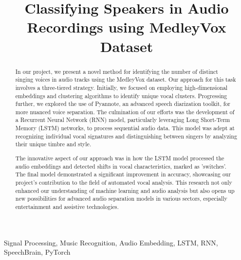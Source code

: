 \documentclass[conference]{IEEEtran}
\begin{document}
\title{Classifying Speakers in Audio Recordings using MedleyVox Dataset
}

\author{
\and
{}
}
\maketitle

\begin{abstract}
In our project, we present a novel method for identifying the number of distinct singing voices in audio tracks using the MedleyVox dataset. 
Our approach for this task involves a three-tiered strategy. Initially, we focused on employing high-dimensional embeddings and clustering algorithms to identify unique vocal clusters. Progressing further, we explored the use of Pyannote, an advanced speech diarization toolkit, for more nuanced voice separation. The culmination of our efforts was the development of a Recurrent Neural Network (RNN) model, particularly leveraging Long Short-Term Memory (LSTM) networks, to process sequential audio data. This model was adept at recognizing individual vocal signatures and distinguishing between singers by analyzing their unique timbre and style.

The innovative aspect of our approach was in how the LSTM model processed the audio embeddings and detected shifts in vocal characteristics, marked as 'switches'. The final model demonstrated a significant improvement in accuracy, showcasing our project's contribution to the field of automated vocal analysis. This research not only enhanced our understanding of machine learning and audio analysis but also opens up new possibilities for advanced audio separation models in various sectors, especially entertainment and assistive technologies.
\end{abstract}

\begin{IEEEkeywords}
Signal Processing, Music Recognition, Audio Embedding, LSTM, RNN, SpeechBrain, PyTorch
\end{IEEEkeywords}
\end{document}
